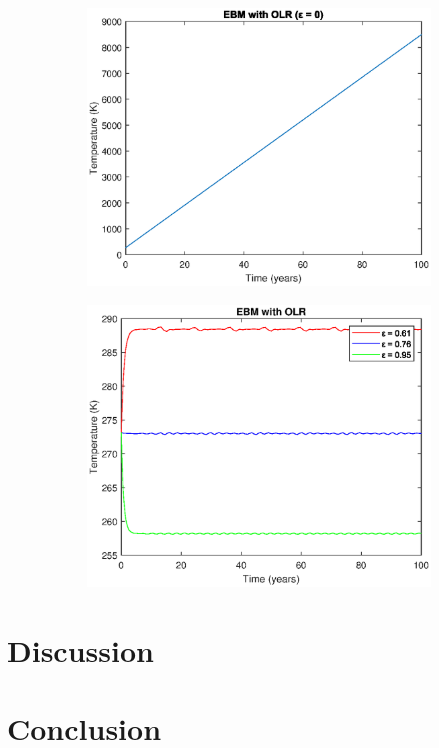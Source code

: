 \documentclass[12pt]{article}
\begin{document}
\begin{figure}[H]
    \begin{subfigure}[width=0.4\linewidth]
        \centering
        \includegraphics[width=\linewidth]{ebm_with_olr_0.eps}
    \end{subfigure}
    \begin{subfigure}[width=0.4\linewidth]
        \centering
        \includegraphics[width=\linewidth]{ebm_with_diff_olrs.eps}
    \end{subfigure}
\end{figure}

\section{Discussion}

\section{Conclusion}
\end{document}
